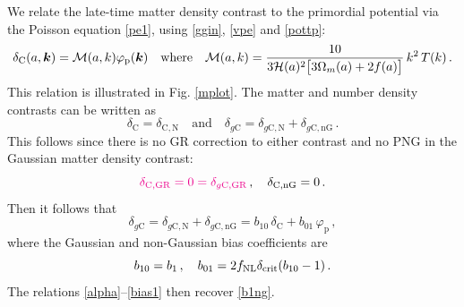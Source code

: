 {We relate the late-time matter density contrast  to the primordial potential via the Poisson equation \eqref{pe1}, using \eqref{ggin}, \eqref{vpe} and \eqref{pottp}:
\begin{align} \label{alpha}
\delta_{\mathrm{C}}(a,\bm {k})=  {\cal M} (a,k)  \varphi_{\mathrm{p}} (\bm {k}) \quad \mbox{where} \quad 
{{\cal M} (a,k)  = \frac{10}{3\mathcal{H}(a)^2\big[3\Omega_m(a) +2f(a) \big]}\,k^2 \, T(k)}\,.
\end{align}
This relation is illustrated in Fig. \ref{mplot}. 
{The matter and number density contrasts can be written as 
\begin{equation} \label{dcng}
\delta_{\mathrm{C}}= \delta_{\mathrm{C,N}} \quad \mbox{and}\quad
\delta_{g\mathrm{C}}= \delta_{g\mathrm{C,N}}+ \delta_{g\mathrm{C,nG}} \,.
\end{equation}
This follows since there is no GR correction to either contrast and no PNG in the Gaussian matter density contrast:}
\begin{equation} \label{dgro1}
{\color{magenta}{\delta_{{\mathrm{C,GR}}} = 0 =\delta_{g{\mathrm{C,GR}}}}}\,,\quad \delta_{{\mathrm{C,nG}}} =0\,.
\end{equation}
Then it follows that}
\begin{equation}\label{dg1b}
\delta_{g{\mathrm{C}}}= \delta_{g \mathrm{C,N}}+ \delta_{g{\mathrm{C,nG}}}=   b_{10}\,\delta_{\mathrm{C}}+ b_{01}\,\varphi_{\mathrm{p}}\,, 
\end{equation}
where the Gaussian and non-Gaussian  bias coefficients are 
\begin{equation}
\label{bias1}
b_{10}= b_1\,,\quad
b_{01}= 2f_\text{NL} \delta_{\mathrm{crit}}(b_{10}-1)\,.
\end{equation}
The relations \eqref{alpha}--\eqref{bias1} then recover \eqref{b1ng}.

